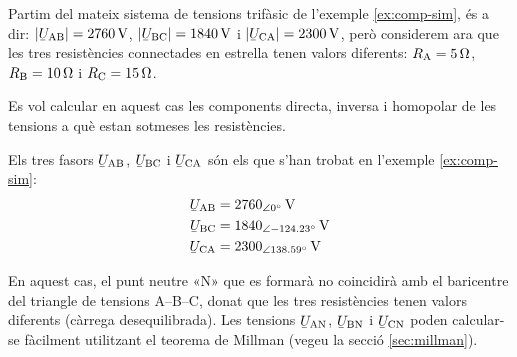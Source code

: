 \begin{exemple}\label{ex:comp-sim-deseq}
    Partim del mateix sistema de tensions trifàsic de l'exemple \vref{ex:comp-sim}, és a dir: $|\cmplx{U}\ped{AB}| =  \SI{2760}{V}$, $|\cmplx{U}\ped{BC}| = \SI{1840}{V}$ i
    $|\cmplx{U}\ped{CA}| = \SI{2300}{V}$, però considerem ara que les tres resistències connectades en estrella tenen valors diferents:  $R_\mathrm{A}=\SI{5}{\ohm}$, $R_\mathrm{B}=\SI{10}{\ohm}$ i $R_\mathrm{C}=\SI{15}{\ohm}$.

    \begin{center}
        
    \end{center}

    Es vol calcular en aquest cas  les components directa, inversa i homopolar de les tensions a què estan sotmeses les resistències.

    Els tres fasors $\cmplx{U}\ped{AB} $, $\cmplx{U}\ped{BC} $ i $\cmplx{U}\ped{CA}$ són els que s'han trobat en l'exemple \ref{ex:comp-sim}:
    \begin{align*}
        \cmplx{U}\ped{AB} &= \SIpd{2760}{0}{V} \\
        \cmplx{U}\ped{BC} &= \SIpd{1840}{-124,23}{V} \\
        \cmplx{U}\ped{CA} &= \SIpd{2300}{138,59}{V}
    \end{align*}

    En aquest cas, el punt neutre «N» que es formarà no coincidirà amb el baricentre del triangle de tensions A--B--C, donat que les tres resistències tenen valors diferents (càrrega  desequilibrada). Les tensions $\cmplx{U}\ped{AN} $, $\cmplx{U}\ped{BN} $ i $\cmplx{U}\ped{CN}$ poden calcular-se fàcilment utilitzant el teorema de Millman (vegeu la secció \vref{sec:millman}).


\end{exemple}
